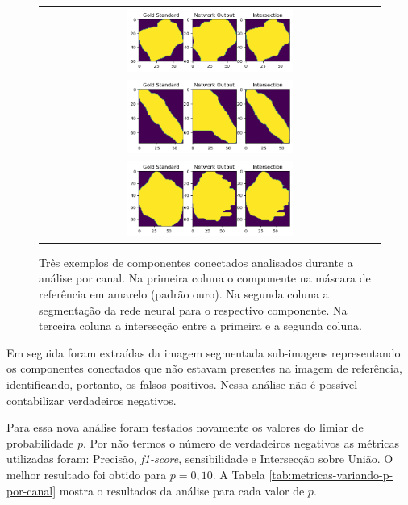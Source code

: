 \begin{figure}[H]
    \centering
    
    \begin{tabular}{@{}c@{}}
        \includegraphics[width=0.5\textwidth]{figures/4_results/components/305_r10c7_component_1.png} \\
        \includegraphics[width=0.5\textwidth]{figures/4_results/components/305_r11c7_component_1.png} \\
        \includegraphics[width=0.5\textwidth]{figures/4_results/components/305_r12c11_component_1.png} 
    \end{tabular}

    \caption[Exemplos de componentes conectados obtidos pelo método proposto.]{Três exemplos de componentes conectados analisados durante a análise por canal. Na primeira coluna o componente na máscara de referência em amarelo (padrão ouro). Na segunda coluna a segmentação da rede neural para o respectivo componente. Na terceira coluna a intersecção entre a primeira e a segunda coluna.}
    \label{fig:intersection-net}
\end{figure}

Em seguida foram extraídas da imagem segmentada sub-imagens representando os componentes conectados que não estavam presentes na imagem de referência, identificando, portanto, os falsos positivos. Nessa análise não é possível contabilizar verdadeiros negativos. 


Para essa nova análise foram testados novamente os valores do limiar de probabilidade $p$. Por não termos o número de verdadeiros negativos as métricas utilizadas foram: Precisão, \textit{f1-score}, sensibilidade e Intersecção sobre União. O melhor resultado foi obtido para \(p = 0,10\). A Tabela \ref{tab:metricas-variando-p-por-canal} mostra o resultados da análise para cada valor de $p$.

